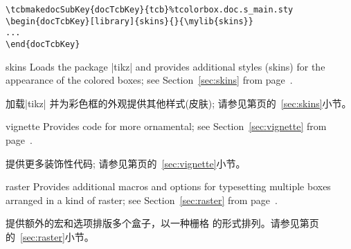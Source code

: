 \begin{verbatim}
\tcbmakedocSubKey{docTcbKey}{tcb}%tcolorbox.doc.s_main.sty
\begin{docTcbKey}[library]{skins}{}{\mylib{skins}}
...
\end{docTcbKey}
\end{verbatim}

\begin{docTcbKey}[library]{skins}{}{}
Loads the package |tikz| %
and provides additional styles (skins) for the appearance of the colored boxes; 
see  Section~\ref{sec:skins} from page~\pageref{sec:skins}.

加载|tikz|\makebox[0pt]{~}%
并为彩色框的外观提供其他样式(皮肤);
请参见第\pageref{sec:skins}页的~\ref{sec:skins}小节。
\end{docTcbKey}

\begin{docTcbKey}[library]{vignette}{}{}
Provides code for more ornamental; see
Section~\ref{sec:vignette} from page~\pageref{sec:vignette}.

提供更多装饰性代码; 请参见第\pageref{sec:vignette}页的~\ref{sec:vignette}小节。

\end{docTcbKey}

\begin{docTcbKey}[library]{raster}{}{}
Provides additional macros and options for typesetting 
multiple boxes arranged in a kind of raster;
see Section~\ref{sec:raster} from page~\pageref{sec:raster}.

提供额外的宏和选项排版多个盒子，以一种栅格\footnotemark%
的形式排列。请参见第\pageref{sec:raster}页的~\ref{sec:raster}小节。
\end{docTcbKey}



